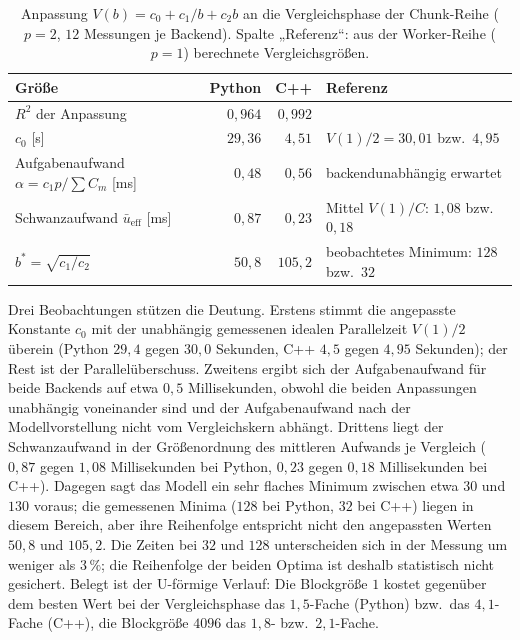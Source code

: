 \documentclass[a4paper,12pt, twoside]{report}
\theoremstyle{definition}
\begin{document}
\begin{table}[!htbp]
\centering
\small
\caption{Anpassung $V(b)=c_0+c_1/b+c_2b$ an die Vergleichsphase der Chunk-Reihe ($p=2$, $12$ Messungen je Backend). Spalte „Referenz“: aus der Worker-Reihe ($p=1$) berechnete Vergleichsgrößen.}
\label{tab:p910_chunkfit}
\begin{tabular}{@{}lrrl@{}}
\toprule
Größe & Python & C++ & Referenz \\
\midrule
$R^2$ der Anpassung & $0{,}964$ & $0{,}992$ & \\
$c_0$ [s] & $29{,}36$ & $4{,}51$ & $V(1)/2=30{,}01$ bzw.\ $4{,}95$ \\
Aufgabenaufwand $\alpha=c_1p/\sum C_m$ [ms] & $0{,}48$ & $0{,}56$ & backendunabhängig erwartet \\
Schwanzaufwand $\bar u_{\mathrm{eff}}$ [ms] & $0{,}87$ & $0{,}23$ & Mittel $V(1)/C$: $1{,}08$ bzw.\ $0{,}18$ \\
$b^\ast=\sqrt{c_1/c_2}$ & $50{,}8$ & $105{,}2$ & beobachtetes Minimum: $128$ bzw.\ $32$ \\
\bottomrule
\end{tabular}
\end{table}

Drei Beobachtungen stützen die Deutung. Erstens stimmt die angepasste Konstante $c_0$ mit der unabhängig gemessenen idealen Parallelzeit $V(1)/2$ überein (Python $29{,}4$ gegen $30{,}0$ Sekunden, C++ $4{,}5$ gegen $4{,}95$ Sekunden); der Rest ist der Parallelüberschuss. Zweitens ergibt sich der Aufgabenaufwand für beide Backends auf etwa $0{,}5$ Millisekunden, obwohl die beiden Anpassungen unabhängig voneinander sind und der Aufgabenaufwand nach der Modellvorstellung nicht vom Vergleichskern abhängt. Drittens liegt der Schwanzaufwand in der Größenordnung des mittleren Aufwands je Vergleich ($0{,}87$ gegen $1{,}08$ Millisekunden bei Python, $0{,}23$ gegen $0{,}18$ Millisekunden bei C++). Dagegen sagt das Modell ein sehr flaches Minimum zwischen etwa $30$ und $130$ voraus; die gemessenen Minima ($128$ bei Python, $32$ bei C++) liegen in diesem Bereich, aber ihre Reihenfolge entspricht nicht den angepassten Werten $50{,}8$ und $105{,}2$. Die Zeiten bei $32$ und $128$ unterscheiden sich in der Messung um weniger als $3\,\%$; die Reihenfolge der beiden Optima ist deshalb statistisch nicht gesichert. Belegt ist der U-förmige Verlauf: Die Blockgröße $1$ kostet gegenüber dem besten Wert bei der Vergleichsphase das $1{,}5$-Fache (Python) bzw.\ das $4{,}1$-Fache (C++), die Blockgröße $4096$ das $1{,}8$- bzw.\ $2{,}1$-Fache.
\end{document}
